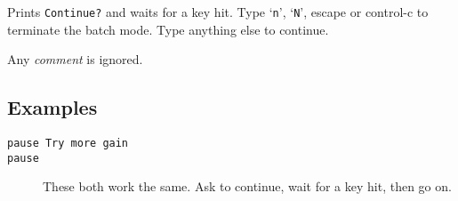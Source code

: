 Prints {\tt Continue?} and waits for a key hit.  Type `{\tt n}', `{\tt N}',
escape or control-c to terminate the batch mode.  Type anything else to 
continue.

Any {\it comment} is ignored.
\subsection{Examples}

\begin{description}

\item[{\tt pause Try more gain}]

\item[{\tt pause}] These both work the same.  Ask to continue, wait for a
key hit, then go on.

\end{description}
